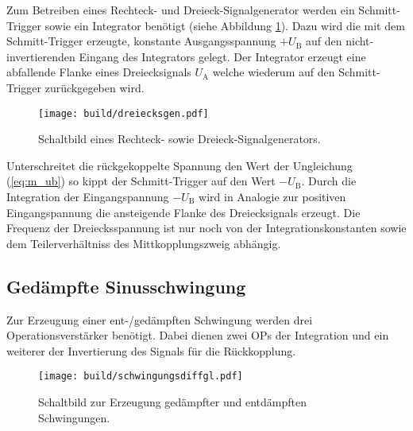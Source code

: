 Zum Betreiben eines Rechteck- und Dreieck-Signalgenerator werden
ein Schmitt-Trigger sowie ein Integrator benötigt (siehe Abbildung
\ref{fig:sig}).
Dazu wird die mit dem Schmitt-Trigger erzeugte, konstante Ausgangsspannung $+ U_\text{B}$
auf den nicht-invertierenden Eingang des Integrators gelegt.
Der Integrator erzeugt eine abfallende Flanke eines Dreiecksignals $U_\text{A}$
welche wiederum auf den Schmitt-Trigger zurückgegeben wird.
\begin{figure}[ht]
		\centering
		\texttt{[image: build/dreiecksgen.pdf]}
		\caption{Schaltbild eines Rechteck- sowie Dreieck-Signalgenerators. \cite{anleitung}}
		\label{fig:sig}
\end{figure}
Unterschreitet die rückgekoppelte Spannung den Wert der Ungleichung (\ref{eq:m_ub})
so kippt der Schmitt-Trigger auf den Wert $-U_\text{B}$.
Durch die Integration der Eingangspannung $-U_\text{B}$ wird in Analogie zur
positiven Eingangspannung die ansteigende Flanke des Dreiecksignals erzeugt.
Die Frequenz der Dreiecksspannung ist nur noch von der Integrationskonstanten sowie
dem Teilerverhältniss des Mittkopplungszweig abhängig.


\subsection{Gedämpfte Sinusschwingung}%
\label{sub:gedaempfte_sinusschwingung}
Zur Erzeugung einer ent-/gedämpften Schwingung werden drei Operationsverstärker
benötigt.
Dabei dienen zwei OPs der Integration und ein weiterer der Invertierung
des Signals für die Rückkopplung.
\begin{figure}[ht]
		\centering
		\texttt{[image: build/schwingungsdiffgl.pdf]}
		\caption{Schaltbild zur Erzeugung gedämpfter und entdämpften Schwingungen. \cite{anleitung}}
		\label{fig:}
\end{figure}

